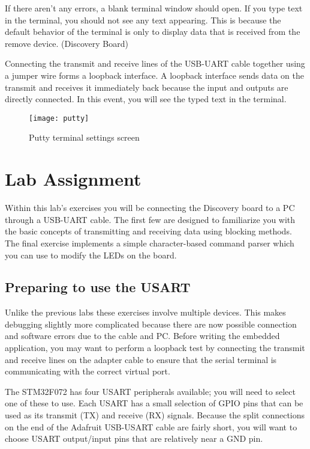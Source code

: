 \documentclass[11pt,fleqn]{book} %
\begin{document}
If there aren't any errors, a blank terminal window should open. If you type text in the terminal, you should not see any text appearing. This is because the default behavior of the terminal is only to display data that is received from the remove device. (Discovery Board) 

Connecting the transmit and receive lines of the USB-UART cable together using a jumper wire forms a loopback interface. A loopback interface sends data on the transmit and receives it immediately back because the input and outputs are directly connected. In this event, you will see the typed text in the terminal. 

\begin{figure}[]
    \centering\texttt{[image: putty]}
    \caption{Putty terminal settings screen}
    \label{putty}
\end{figure}



\section{Lab Assignment}
Within this lab's exercises you will be connecting the Discovery board to a PC through a USB-UART cable. The first few are designed to familiarize you with the basic concepts of transmitting and receiving data using blocking methods. The final exercise implements a simple character-based command parser which you can use to modify the LEDs on the board.  

\subsection{Preparing to use the USART} 
Unlike the previous labs these exercises involve multiple devices. This makes debugging slightly more complicated because there are now possible connection and software errors due to the cable and PC. Before writing the embedded application, you may want to perform a loopback test by connecting the transmit and receive lines on the adapter cable to ensure that the serial terminal is communicating with the correct virtual port. 

The STM32F072 has four USART peripherals available; you will need to select one of these to use. Each USART has a small selection of GPIO pins that can be used as its transmit (TX) and receive (RX) signals. Because the split connections on the end of the Adafruit USB-USART cable are fairly short, you will want to choose USART output/input pins that are relatively near a GND pin.
 
\end{document}
